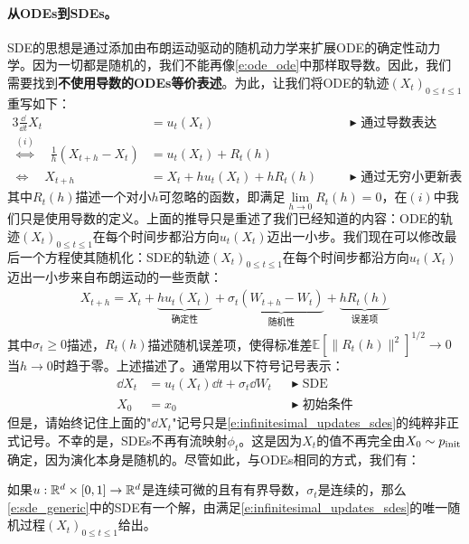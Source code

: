 \paragraph{从ODEs到SDEs。} SDE的思想是通过添加由布朗运动驱动的随机动力学来扩展ODE的确定性动力学。因为一切都是随机的，我们不能再像\cref{e:ode_ode}中那样取导数。因此，我们需要找到\textbf{不使用导数的ODEs等价表述}。为此，让我们将ODE的轨迹$(X_t)_{0\leq t\leq 1}$重写如下：
\begin{alignat*}{3}
    \frac{\dd}{\dd t} X_t &=  u_t(X_t) \quad &&\blacktriangleright\,\,\text{通过导数表达}\\
    \overset{(i)}{\Leftrightarrow} \quad  \frac{1}{h}\left(X_{t+h}-X_{t}\right)&=u_t(X_t) + R_t(h)&&\\
\Leftrightarrow \quad X_{t+h} &= X_{t}+hu_t(X_t) + hR_t(h)\quad &&\blacktriangleright\,\,\text{通过无穷小更新表达}
\end{alignat*}
其中$R_t(h)$描述一个对小$h$可忽略的函数，即满足$\lim\limits_{h\to 0}R_t(h)=0$，在$(i)$中我们只是使用导数的定义。上面的推导只是重述了我们已经知道的内容：ODE的轨迹$(X_t)_{0 \le t \le 1}$在每个时间步都沿方向$u_t(X_t)$迈出一小步。我们现在可以修改最后一个方程使其随机化：SDE的轨迹$(X_t)_{0 \le t \le 1}$在每个时间步都沿方向$u_t(X_t)$迈出一小步来自布朗运动的一些贡献：
\begin{align}
    X_{t+h} = X_{t}+\underbrace{hu_t(X_t)}_{\text{确定性}} + \sigma_t\underbrace{(W_{t+h}-W_{t})}_{\text{随机性}}+\underbrace{hR_t(h)}_{\text{误差项}}
\end{align}
其中$\sigma_t\geq 0$描述，$R_t(h)$描述随机误差项，使得标准差$\mathbb{E}[\|R_t(h)\|^2]^{1/2}\to 0$当$h\to 0$时趋于零。上述描述了。通常用以下符号记号表示：
\begin{subequations}
    \begin{align} 
      \dd X_t &= u_t(X_t)\dd t + \sigma_t\dd W_t &&\blacktriangleright\,\,\text{SDE}\\
      X_0 &= x_0               &&\blacktriangleright\,\,\text{初始条件}
    \end{align}
\end{subequations}
但是，请始终记住上面的"$\dd X_t$"记号只是\cref{e:infinitesimal_updates_sdes}的纯粹非正式记号。不幸的是，SDEs不再有流映射$\phi_t$。这是因为$X_t$的值不再完全由$X_0\sim p_{\rm{init}}$确定，因为演化本身是随机的。尽管如此，与ODEs相同的方式，我们有：

如果$u:\mathbb{R}^d\times[0,1]\to\mathbb{R}^d$是连续可微的且有有界导数，$\sigma_t$是连续的，那么\eqref{e:sde_generic}中的SDE有一个解，由满足\cref{e:infinitesimal_updates_sdes}的唯一随机过程$(X_t)_{0\leq t\leq 1}$给出。

